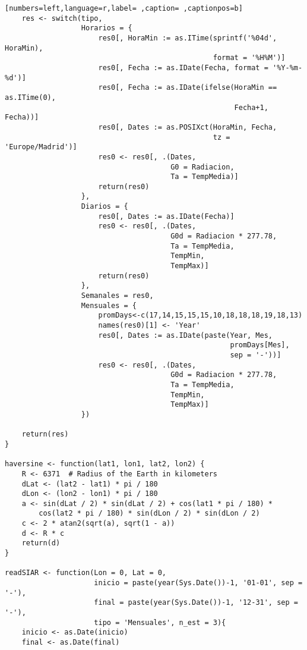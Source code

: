 \begin{lstlisting}[numbers=left,language=r,label= ,caption= ,captionpos=b]
    res <- switch(tipo,
                  Horarios = {
                      res0[, HoraMin := as.ITime(sprintf('%04d', HoraMin),
                                                 format = '%H%M')]
                      res0[, Fecha := as.IDate(Fecha, format = '%Y-%m-%d')]
                      res0[, Fecha := as.IDate(ifelse(HoraMin == as.ITime(0),
                                                      Fecha+1, Fecha))]
                      res0[, Dates := as.POSIXct(HoraMin, Fecha,
                                                 tz = 'Europe/Madrid')]
                      res0 <- res0[, .(Dates,
                                       G0 = Radiacion,
                                       Ta = TempMedia)]
                      return(res0)
                  },
                  Diarios = {
                      res0[, Dates := as.IDate(Fecha)]
                      res0 <- res0[, .(Dates,
                                       G0d = Radiacion * 277.78,
                                       Ta = TempMedia,
                                       TempMin,
                                       TempMax)]
                      return(res0)
                  },
                  Semanales = res0,
                  Mensuales = {
                      promDays<-c(17,14,15,15,15,10,18,18,18,19,18,13)
                      names(res0)[1] <- 'Year'
                      res0[, Dates := as.IDate(paste(Year, Mes,
                                                     promDays[Mes],
                                                     sep = '-'))]
                      res0 <- res0[, .(Dates,
                                       G0d = Radiacion * 277.78,
                                       Ta = TempMedia,
                                       TempMin,
                                       TempMax)]
                  })

    return(res)
}

haversine <- function(lat1, lon1, lat2, lon2) {
    R <- 6371  # Radius of the Earth in kilometers
    dLat <- (lat2 - lat1) * pi / 180
    dLon <- (lon2 - lon1) * pi / 180
    a <- sin(dLat / 2) * sin(dLat / 2) + cos(lat1 * pi / 180) *
        cos(lat2 * pi / 180) * sin(dLon / 2) * sin(dLon / 2)
    c <- 2 * atan2(sqrt(a), sqrt(1 - a))
    d <- R * c
    return(d)
}

readSIAR <- function(Lon = 0, Lat = 0,
                     inicio = paste(year(Sys.Date())-1, '01-01', sep = '-'),
                     final = paste(year(Sys.Date())-1, '12-31', sep = '-'),
                     tipo = 'Mensuales', n_est = 3){
    inicio <- as.Date(inicio)
    final <- as.Date(final)


\end{lstlisting}
